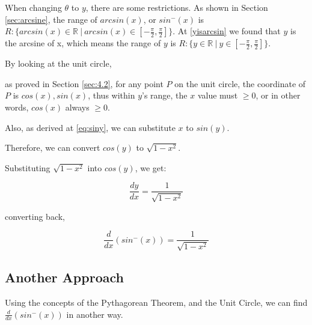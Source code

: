 \documentclass[12pt, titlepage]{article}
\begin{document}
    When changing $\theta$ to $y$, there are some restrictions. As shown in Section \ref{sec:arcsine}, the range of $arcsin(x)$, or $sin^-(x)$ is $R: \{arcsin(x)\in\mathbb{R}\:|\:arcsin(x)\in [-\frac{\pi}{2}, \frac{\pi}{2}]\}$. At 
    \eqref{yisarcsin} we found that $y$ is the arcsine of x, which means the range of $y$ is $R: \{y\in\mathbb{R}\:|\:y\in [-\frac{\pi}{2}, \frac{\pi}{2}]\}$.
    
    By looking at the unit circle,
    \begin{center}
    \end{center}
    as proved in Section \ref{sec:4.2}, for any point $P$ on the unit circle, the coordinate of $P$ is $cos(x), sin(x)$, thus within $y$'s range, the $x$ value must $\geq0$, or in other words, $cos(x)$ always $\geq0$.
    
    Also, as derived at \eqref{eq:siny}, we can substitute $x$ to $sin(y)$.

    Therefore, we can convert $cos(y)$ to $\sqrt{1-x^2}$.

    Substituting $\sqrt{1-x^2}$ into $cos(y)$, we get:
    \begin{center}
        \begin{equation}
            \frac{dy}{dx} =\frac{1}{\sqrt{1-x^2}}
        \end{equation}
    \end{center}
    converting back, 
    \begin{center}
        \begin{equation}
            \label{eq:dasin}
            \frac{d}{dx}(sin^-(x)) =\frac{1}{\sqrt{1-x^2}}
        \end{equation}
    \end{center}

    \subsection{Another Approach}
    Using the concepts of the Pythagorean Theorem, and the Unit Circle, we can find $\frac{d}{dx}(sin^-(x))$ in another way.
\end{document}
